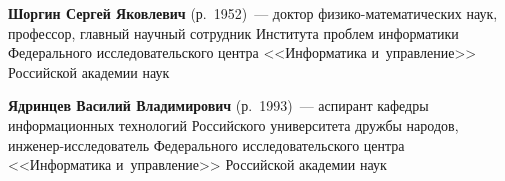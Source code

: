 \begin{multicols}{2}
\vspace*{3.9pt}

\noindent
\textbf{Шоргин Сергей Яковлевич} (р.\ 1952)~--- доктор фи\-зи\-ко-ма\-те\-ма\-ти\-че\-ских наук, 
профессор, главный научный сотрудник Института  
проб\-лем информатики Федерального исследовательского цент\-ра <<Информатика и~управление>> 
Российской академии наук

\smallskip  

\vspace*{3.9pt}

\noindent
\textbf{Ядринцев Василий Владимирович} (р.\ 1993)~--- аспирант кафедры информационных 
технологий Российского университета дружбы народов, инженер-исследователь Федерального 
исследовательского цент\-ра <<Информатика и~управ\-ле\-ние>> Российской академии наук




\def\leftkol{ОБ АВТОРАХ}

\def\rightkol{ОБ АВТОРАХ}


 \label{end\stat}



\end{multicols}

\def\leftkol{ОБ АВТОРАХ}
\def\rightkol{ОБ АВТОРАХ}

\newpage
